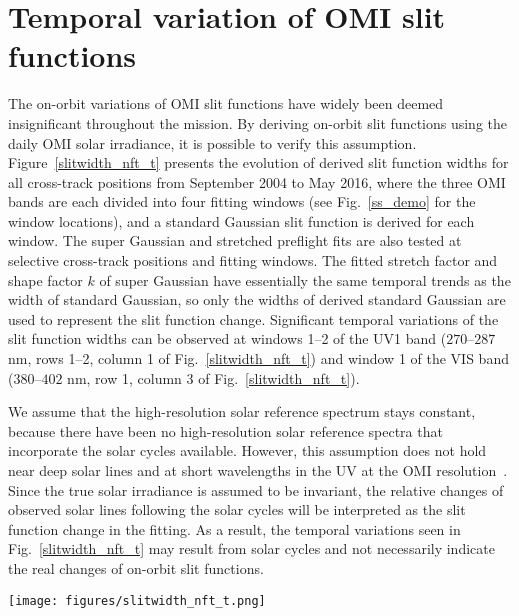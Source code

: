 \documentclass[amt,manuscript]{copernicus}
\begin{document}
\section{Temporal variation of OMI slit functions \label{slit_temporal_section}}

The on-orbit variations of OMI slit functions have widely been deemed insignificant throughout the mission. By deriving on-orbit slit functions using the daily OMI solar irradiance, it is possible to verify this assumption. Figure~\ref{slitwidth_nft_t} presents the evolution of derived slit function widths for all cross-track positions from September 2004 to May 2016, where the three OMI bands are each divided into four fitting windows (see Fig.~\ref{ss_demo} for the window locations), and a standard Gaussian slit function is derived for each window. The super Gaussian and stretched preflight fits are also tested at selective cross-track positions and fitting windows. The fitted stretch factor and shape factor $k$ of super Gaussian have essentially the same temporal trends as the width of standard Gaussian, so only the widths of derived standard Gaussian are used to represent the slit function change. Significant temporal variations of the slit function widths can be observed at windows 1--2 of the UV1 band ($270$--$287$ nm, rows 1--2, column 1 of Fig.~\ref{slitwidth_nft_t}) and window 1 of the VIS band ($380$--$402$ nm, row 1, column 3 of Fig.~\ref{slitwidth_nft_t}).

We assume that the high-resolution solar reference spectrum stays constant, because there have been no high-resolution solar reference spectra that incorporate the solar cycles available. However, this assumption does not hold near deep solar lines and at short wavelengths in the UV at the OMI resolution~\citep{marchenko2014solar,marchenko2016solar}. Since the true solar irradiance is assumed to be invariant, the relative changes of observed solar lines following the solar cycles will be interpreted as the slit function change in the fitting. As a result, the temporal variations seen in Fig.~\ref{slitwidth_nft_t} may result from solar cycles and not necessarily indicate the real changes of on-orbit slit functions.

\begin{figure*}[tbhp]
\texttt{[image: figures/slitwidth\_nft\_t.png]}
\caption{Temporal variations of derived standard Gaussian slit function FWHM for all cross-track positions from September 2004 to May 2016. Three OMI bands (columns of the plot) are each divided into four fitting windows (rows of the plot). Spectral coverages of each window are also labeled in the title of each subplot.}
\label{slitwidth_nft_t}
\end{figure*}
\end{document}
